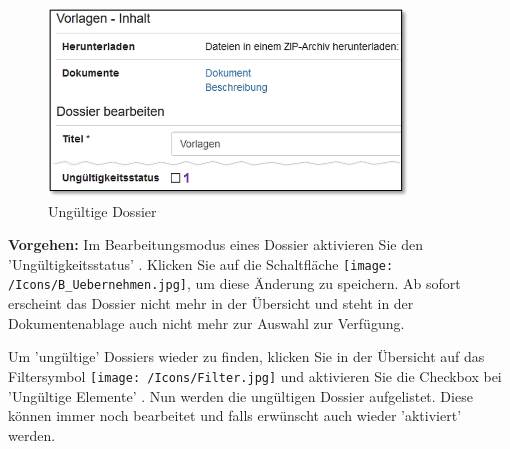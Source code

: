 \vspace{\baselineskip}

\begin{figure}   %
  \vspace{-30pt}      %
  \begin{center}
    \includegraphics[height=50mm]{../chapters/11_Dokumentenablage/pictures/doss_edit_ungueltig.jpg}
  \end{center}
  \vspace{-20pt}
  \caption{Ungültige Dossier}
  \vspace{-10pt}
\end{figure}
\textbf{Vorgehen:} Im Bearbeitungsmodus eines Dossier aktivieren Sie den 'Ungültigkeitsstatus' . Klicken Sie auf die Schaltfläche \texttt{[image: /Icons/B\_Uebernehmen.jpg]}, um diese Änderung zu speichern. Ab sofort erscheint das Dossier nicht mehr in der Übersicht und steht in der Dokumentenablage auch nicht mehr zur Auswahl zur Verfügung.

\vspace{5cm}

Um 'ungültige' Dossiers wieder zu finden, klicken Sie in der Übersicht auf das Filtersymbol \texttt{[image: /Icons/Filter.jpg]}  und aktivieren Sie die Checkbox bei 'Ungültige Elemente' . Nun werden die ungültigen Dossier aufgelistet. Diese können immer noch bearbeitet und falls erwünscht auch wieder 'aktiviert' werden.

\begin{figure}[H]
\end{figure}

